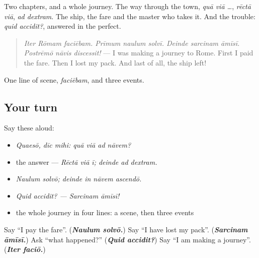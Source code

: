 \begin{grammarlens}[title={What you've built}]
Two chapters, and a whole journey. The way through the town, \emph{quā viā …}, \emph{rēctā viā}, \emph{ad dextram}. The ship, the fare and the master who takes it. And the trouble: \emph{quid accidit?}, answered in the perfect.

\begin{quote}
\emph{Iter Rōmam faciēbam. Prīmum naulum solvī. Deinde sarcinam āmīsī. Postrēmō nāvis discessit!} — I was making a journey to Rome. First I paid the fare. Then I lost my pack. And last of all, the ship left!
\end{quote}

One line of scene, \emph{faciēbam}, and three events.
\end{grammarlens}

\subsection*{Your turn}
Say these aloud:

\begin{itemize}
\raggedright
  \item \emph{Quaesō, dīc mihi: quā viā ad nāvem?}
  \item the answer — \emph{Rēctā viā ī; deinde ad dextram.}
  \item \emph{Naulum solvō; deinde in nāvem ascendō.}
  \item \emph{Quid accidit? — Sarcinam āmīsī!}
  \item the whole journey in four lines: a scene, then three events
\end{itemize}

\begin{tcolorbox}[breakable,colback=teal!4,colframe=teal!35!black,title={Before you move on}]
Say \textquotedblleft{}I pay the fare\textquotedblright{}. (\emph{\textbf{Naulum solvō.}}) Say \textquotedblleft{}I have lost my pack\textquotedblright{}. (\emph{\textbf{Sarcinam āmīsī.}}) Ask \textquotedblleft{}what happened?\textquotedblright{} (\emph{\textbf{Quid accidit?}}) Say \textquotedblleft{}I am making a journey\textquotedblright{}. (\emph{\textbf{Iter faciō.}})
\end{tcolorbox}
